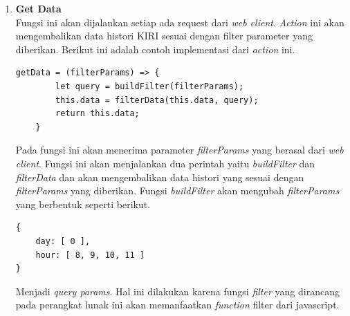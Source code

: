 \begin{enumerate}
Fungsi ini akan akan memanfaatkan \textit{method split} untuk membagi raw data \ref{load_data_2} menjadi array yang berbentuk seperti berikut.

\begin{lstlisting}[label=data_parser_1 , caption=Data Split Result]
[
  '115566',
  'A44EB361A179A49E',
  '2/2/2014 9:07',
  'FINDROUTE',
  '"-0.7819376',
  '100.2871169/-6.90359',
  '107.60040/1"\r'
]

\end{lstlisting}
Berdasarkan data \ref{data_parser_1} kita dapat mengekstrak  \textit{action type} \ref{sec:analisisDataHistoriKiri} pada posisi ketiga dari array tersebut. Dalam aplikasi ini hanya akan digunakan data yang memiliki \textit{action} \textit{FINDROUTE} hal ini dikarenakan hanya pada \textit{action} ini data mengandung \textit{value} dari posisi \textit{start} dan \textit{finish}. Setelah function \textit{csvToObject} ini dijalankan maka akan mengembalikan kumpulan \textit{object} data yang berbentuk sebagai berikut.

\begin{lstlisting}[label=data_parser_result , caption=Result Data]
[
    {
      apiKey: '113915',
      timestamp: 2014-01-31T17:11:00.000Z,
      action: 'FINDROUTE',
      startCor: { lat: -6.8972513, lng: 107.6385574 },
      endCor: { lat: -6.91358, lng: 107.62718 },
      day: 6,
      hour: 0
    }
]
\end{lstlisting}

\item{\textbf{Get Data}} \\
Fungsi ini akan dijalankan setiap ada request dari \textit{web client}. \textit{Action} ini akan mengembalikan data histori KIRI sesuai dengan filter parameter yang diberikan. Berikut ini adalah contoh implementasi dari \textit{action} ini.
\begin{lstlisting}[label=get_data , caption=Function Get Data]
    getData = (filterParams) => {
        let query = buildFilter(filterParams);
        this.data = filterData(this.data, query);
        return this.data;
    }
\end{lstlisting}
Pada fungsi ini akan menerima parameter \textit{filterParams} yang berasal dari \textit{web client}. Fungsi ini akan menjalankan dua perintah yaitu \textit{buildFilter} dan  \textit{filterData} dan akan mengembalikan data histori yang sesuai dengan \textit{filterParams} yang diberikan. Fungsi \textit{buildFilter} akan mengubah \textit{filterParams} yang berbentuk seperti berikut.
\begin{lstlisting}[label=filter_params , caption=Filter Parameter]
{
    day: [ 0 ], 
    hour: [ 8, 9, 10, 11 ] 
}
\end{lstlisting}
Menjadi \textit{query params}. Hal ini dilakukan karena fungsi \textit{filter} yang dirancang pada perangkat lunak ini akan memanfaatkan \textit{function} filter dari javascript.


\end{enumerate}
